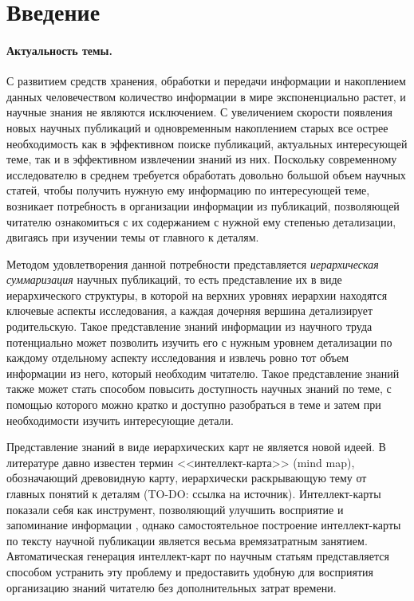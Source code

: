 \documentclass[12pt]{article}
\begin{document}
\newpage

\section*{Введение}

\paragraph{Актуальность темы.} С развитием средств хранения, обработки и передачи информации и накоплением данных человечеством количество информации в мире экспоненциально растет, и научные знания не являются исключением. С увеличением скорости появления новых научных публикаций и одновременным накоплением старых все острее необходимость как в эффективном поиске публикаций, актуальных интересующей теме, так и в эффективном извлечении знаний из них. Поскольку современному исследователю в среднем требуется обработать довольно большой объем научных статей, чтобы получить нужную ему информацию по интересующей теме, возникает потребность в организации информации из публикаций, позволяющей читателю ознакомиться с их содержанием с нужной ему степенью детализации, двигаясь при изучении темы от главного к деталям. 

Методом удовлетворения данной потребности представляется \textit{иерархическая суммаризация} научных публикаций, то есть представление их в виде иерархического структуры, в которой на верхних уровнях иерархии находятся ключевые аспекты исследования, а каждая дочерняя вершина детализирует родительскую. Такое представление знаний информации из научного труда потенциально может позволить изучить его с нужным уровнем детализации по каждому отдельному аспекту исследования и извлечь ровно тот объем информации из него, который необходим читателю. Такое представление знаний также может стать способом повысить доступность научных знаний по теме, с помощью которого можно кратко и доступно разобраться в теме и затем при необходимости изучить интересующие детали.

Представление знаний в виде иерархических карт не является новой идеей. В литературе давно известен термин <<интеллект-карта>> (mind map), обозначающий древовидную карту, иерархически раскрывающую тему от главных понятий к деталям (TO-DO: ссылка на источник). Интеллект-карты показали себя как инструмент, позволяющий улучшить восприятие и запоминание информации \cite{guerrero2015mind}, однако самостоятельное построение интеллект-карты по тексту научной публикации является весьма времязатратным занятием. Автоматическая генерация интеллект-карт по научным статьям представляется способом устранить эту проблему и предоставить удобную для восприятия организацию знаний читателю без дополнительных затрат времени.
\end{document}
